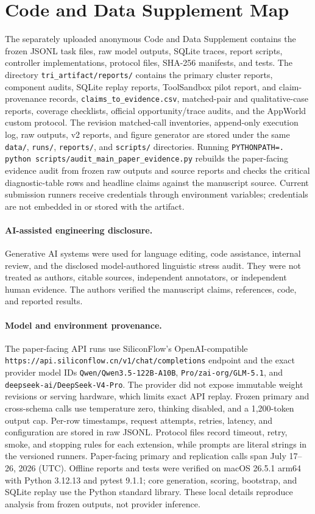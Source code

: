 \documentclass[10pt]{article}
\begin{document}
\section{Code and Data Supplement Map}
\enlargethispage{2\baselineskip}
The separately uploaded anonymous Code and Data Supplement contains the frozen JSONL task files,
raw model outputs, SQLite traces, report scripts, controller implementations, protocol files,
SHA-256 manifests, and tests. The directory \texttt{tri\_artifact/reports/} contains the primary
cluster reports, component audits, SQLite replay reports, ToolSandbox pilot report, and
claim-provenance records, \texttt{claims\_to\_evidence.csv}, matched-pair and qualitative-case reports, coverage checklists,
official opportunity/trace audits, and the AppWorld custom protocol.
The revision matched-call inventories, append-only execution log, raw outputs, v2 reports, and
figure generator are stored under the same \texttt{data/}, \texttt{runs/}, \texttt{reports/}, and
\texttt{scripts/} directories.
Running \texttt{PYTHONPATH=. python scripts/audit\_main\_paper\_evidence.py} rebuilds the
paper-facing evidence audit from frozen raw outputs and source reports and checks the critical
diagnostic-table rows and headline claims against the manuscript source.
Current submission runners receive credentials through environment
variables; credentials are not embedded in or stored with the artifact.

\paragraph{AI-assisted engineering disclosure.}
Generative AI systems were used for language editing, code assistance, internal review, and the
disclosed model-authored linguistic stress audit. They were not treated as authors, citable
sources, independent annotators, or independent human
evidence. The authors verified the manuscript claims, references, code, and reported results.

\paragraph{Model and environment provenance.}
The paper-facing API runs use SiliconFlow's OpenAI-compatible
\texttt{https://api.siliconflow.cn/v1/chat/completions} endpoint and the exact provider model IDs
\texttt{Qwen/Qwen3.5-122B-A10B}, \texttt{Pro/zai-org/GLM-5.1}, and
\texttt{deepseek-ai/DeepSeek-V4-Pro}. The provider did not expose immutable weight revisions or
serving hardware, which limits exact API replay. Frozen primary and cross-schema calls use
temperature zero, thinking disabled, and a 1,200-token output cap. Per-row timestamps, request attempts, retries,
latency, and configuration are stored in raw JSONL. Protocol files record timeout, retry, smoke,
and stopping rules for each extension, while prompts are literal strings in the versioned
runners. Paper-facing primary and replication calls span July 17--26, 2026 (UTC). Offline reports
and tests were verified on macOS 26.5.1 arm64 with Python 3.12.13 and
pytest 9.1.1; core generation, scoring, bootstrap, and SQLite replay use the Python standard
library. These local details reproduce analysis from frozen outputs, not provider inference.



\end{document}
